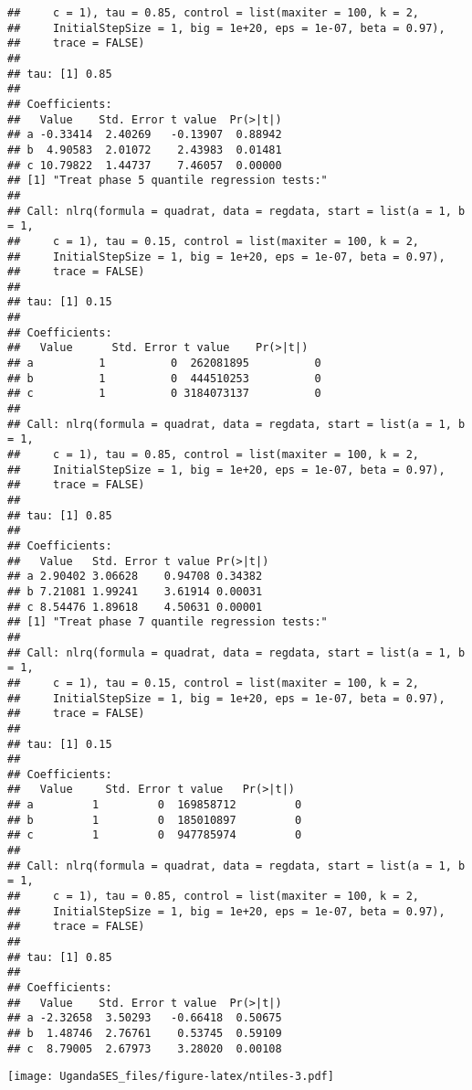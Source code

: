 \documentclass[
]{article}
\begin{document}
\begin{verbatim}
##     c = 1), tau = 0.85, control = list(maxiter = 100, k = 2, 
##     InitialStepSize = 1, big = 1e+20, eps = 1e-07, beta = 0.97), 
##     trace = FALSE)
## 
## tau: [1] 0.85
## 
## Coefficients:
##   Value    Std. Error t value  Pr(>|t|)
## a -0.33414  2.40269   -0.13907  0.88942
## b  4.90583  2.01072    2.43983  0.01481
## c 10.79822  1.44737    7.46057  0.00000
## [1] "Treat phase 5 quantile regression tests:"
## 
## Call: nlrq(formula = quadrat, data = regdata, start = list(a = 1, b = 1, 
##     c = 1), tau = 0.15, control = list(maxiter = 100, k = 2, 
##     InitialStepSize = 1, big = 1e+20, eps = 1e-07, beta = 0.97), 
##     trace = FALSE)
## 
## tau: [1] 0.15
## 
## Coefficients:
##   Value      Std. Error t value    Pr(>|t|)  
## a          1          0  262081895          0
## b          1          0  444510253          0
## c          1          0 3184073137          0
## 
## Call: nlrq(formula = quadrat, data = regdata, start = list(a = 1, b = 1, 
##     c = 1), tau = 0.85, control = list(maxiter = 100, k = 2, 
##     InitialStepSize = 1, big = 1e+20, eps = 1e-07, beta = 0.97), 
##     trace = FALSE)
## 
## tau: [1] 0.85
## 
## Coefficients:
##   Value   Std. Error t value Pr(>|t|)
## a 2.90402 3.06628    0.94708 0.34382 
## b 7.21081 1.99241    3.61914 0.00031 
## c 8.54476 1.89618    4.50631 0.00001 
## [1] "Treat phase 7 quantile regression tests:"
## 
## Call: nlrq(formula = quadrat, data = regdata, start = list(a = 1, b = 1, 
##     c = 1), tau = 0.15, control = list(maxiter = 100, k = 2, 
##     InitialStepSize = 1, big = 1e+20, eps = 1e-07, beta = 0.97), 
##     trace = FALSE)
## 
## tau: [1] 0.15
## 
## Coefficients:
##   Value     Std. Error t value   Pr(>|t|) 
## a         1         0  169858712         0
## b         1         0  185010897         0
## c         1         0  947785974         0
## 
## Call: nlrq(formula = quadrat, data = regdata, start = list(a = 1, b = 1, 
##     c = 1), tau = 0.85, control = list(maxiter = 100, k = 2, 
##     InitialStepSize = 1, big = 1e+20, eps = 1e-07, beta = 0.97), 
##     trace = FALSE)
## 
## tau: [1] 0.85
## 
## Coefficients:
##   Value    Std. Error t value  Pr(>|t|)
## a -2.32658  3.50293   -0.66418  0.50675
## b  1.48746  2.76761    0.53745  0.59109
## c  8.79005  2.67973    3.28020  0.00108
\end{verbatim}

\texttt{[image: UgandaSES\_files/figure-latex/ntiles-3.pdf]}
\end{document}
